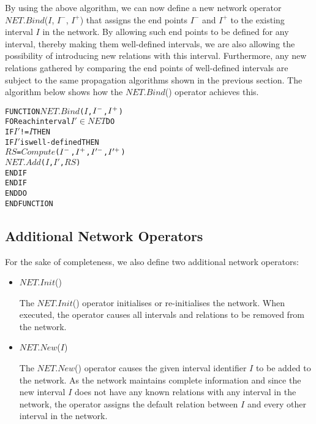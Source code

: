 \documentclass[11pt]{report}
\newenvironment{vverbatim}
{
  \begin{alltt}
}
{
  \vspace{-\baselineskip}
  \end{alltt}
}
\begin{document}
        By using the above algorithm, we can now define a new network operator
        $NET.Bind$($I$, $I^-$, $I^+$) that assigns the end points $I^-$ and
        $I^+$ to the existing interval $I$ in the network. By allowing such
        end points to be defined for any interval, thereby making them
        well-defined intervals, we are also allowing the possibility of
        introducing new relations with this interval. Furthermore, any new
        relations gathered by comparing the end points of well-defined
        intervals are subject to the same propagation algorithms shown in the
        previous section. The algorithm below shows how the $NET.Bind$()
        operator achieves this.

        \begin{vverbatim}
  FUNCTION \(NET.Bind\)(\(I\), \(I\sp{-}\), \(I\sp{+}\))
    FOR each interval \(I'\) \(\in\) \(NET\) DO
      IF \(I'\) != \(I\) THEN
        IF \(I'\) is well-defined THEN
          \(RS\) = \(Compute\)(\(I\sp{-}\), \(I\sp{+}\), \(I'\sp{-}\), \(I'\sp{+}\))
          \(NET.Add\)(\(I\), \(I'\), \(RS\))
        ENDIF
      ENDIF
    ENDDO
  ENDFUNCTION
        \end{vverbatim}

      \subsection{Additional Network Operators}

        For the sake of completeness, we also define two additional network
        operators:

        \begin{itemize}
          \item
            $NET.Init$()

            The $NET.Init$() operator initialises or re-initialises the
            network. When executed, the operator causes all intervals and
            relations to be removed from the network.

          \item
            $NET.New$($I$)

            The $NET.New$() operator causes the given interval identifier $I$
            to be added to the network. As the network maintains complete
            information and since the new interval $I$ does not have any known
            relations with any interval in the network, the operator assigns
            the default relation between $I$ and every other interval in the
            network.
        \end{itemize}
\end{document}
